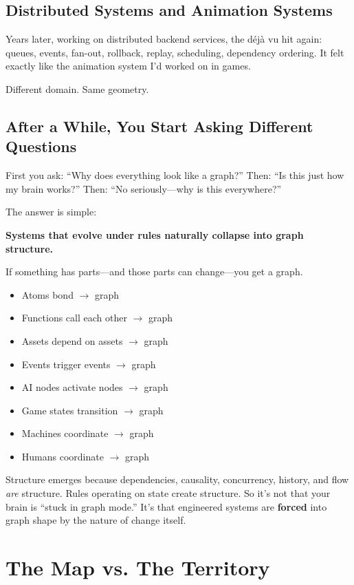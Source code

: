 \subsection{Distributed Systems and Animation Systems}

Years later, working on distributed backend services, the déjà vu hit again: queues, events, fan-out, rollback, replay, scheduling, dependency ordering.  
It felt exactly like the animation system I'd worked on in games.

Different domain. Same geometry.

\subsection{After a While, You Start Asking Different Questions}

First you ask: ``Why does everything look like a graph?''  
Then: ``Is this just how my brain works?''  
Then: ``No seriously—why is this everywhere?''

The answer is simple:

\textbf{Systems that evolve under rules naturally collapse into graph structure.}

If something has parts—and those parts can change—you get a graph.

\begin{itemize}
    \item Atoms bond $\rightarrow$ graph
    \item Functions call each other $\rightarrow$ graph
    \item Assets depend on assets $\rightarrow$ graph
    \item Events trigger events $\rightarrow$ graph
    \item AI nodes activate nodes $\rightarrow$ graph
    \item Game states transition $\rightarrow$ graph
    \item Machines coordinate $\rightarrow$ graph
    \item Humans coordinate $\rightarrow$ graph
\end{itemize}

Structure emerges because dependencies, causality, concurrency, history, and flow \textit{are} structure.  
Rules operating on state create structure.  
So it’s not that your brain is “stuck in graph mode.”  
It’s that engineered systems are \textbf{forced} into graph shape by the nature of change itself.

\section*{The Map vs. The Territory}

